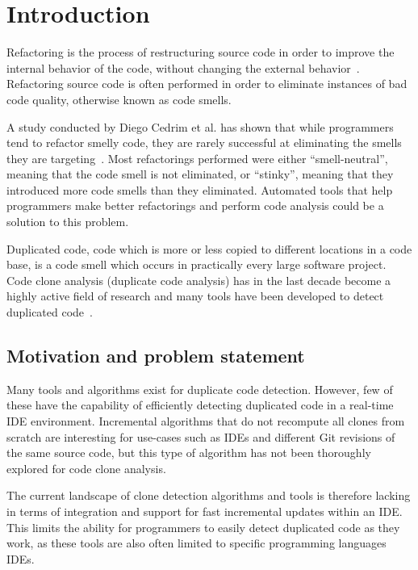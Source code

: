 \chapter{Introduction}

Refactoring is the process of restructuring source code in order to improve the internal
behavior of the code, without changing the external behavior~\cite[9]{fowlerrefactoring}.
Refactoring source code is often performed in order to eliminate instances of bad code
quality, otherwise known as code smells.

A study conducted by Diego Cedrim et al. has shown that while programmers tend to refactor
smelly code, they are rarely successful at eliminating the smells they are
targeting~\cite{Rohit_Gheyi_Impact}. Most refactorings performed were either
``smell-neutral'', meaning that the code smell is not eliminated, or ``stinky'',
meaning that they introduced more code smells than they eliminated. Automated tools that
help programmers make better refactorings and perform code analysis could be a solution to
this problem.

Duplicated code, code which is more or less copied to different locations in a code base,
is a code smell which occurs in practically every large software project. Code clone
analysis (duplicate code analysis) has in the last decade become a highly active field of
research and many tools have been developed to detect duplicated
code~\cite[6]{Inoue_introduction_to_cc}. 

\section{Motivation and problem statement}

Many tools and algorithms exist for duplicate code detection. However, few of these have
the capability of efficiently detecting duplicated code in a real-time IDE environment.
Incremental algorithms that do not recompute all clones from scratch are interesting for
use-cases such as IDEs and different Git revisions of the same source code, but this type of
algorithm has not been thoroughly explored for code clone analysis.

The current landscape of clone detection algorithms and tools is therefore lacking in
terms of integration and support for fast incremental updates within an IDE. This limits
the ability for programmers to easily detect duplicated code as they work, as these tools
are also often limited to specific programming languages  IDEs.

